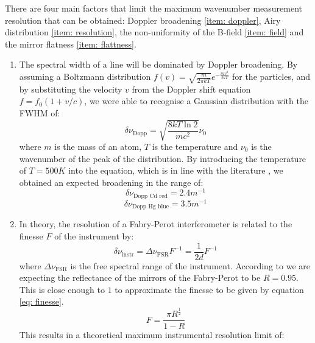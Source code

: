 \documentclass[11pt]{article}
\begin{document}
There are four main factors that limit the maximum wavenumber measurement resolution that can be obtained: Doppler broadening \ref{item: doppler}, Airy distribution \ref{item: resolution}, the non-uniformity of the B-field \ref{item: field} and the mirror flatness \ref{item: flattness}. 
\begin{enumerate}[label=(\alph*), ref=(\alph*)]
  \item \label{item: doppler} The spectral width of a line will be dominated by Doppler broadening. By assuming a Boltzmann distribution $f(v) = \sqrt{\frac{m}{2 \pi k T}} e^{-\frac{mv^2}{2kT}}$ for the particles, and by substituting the velocity $v$ from the Doppler shift equation $f = f_0 (1+v/c)$, we were able to recognise a Gaussian distribution with the FWHM of: 
  \begin{equation}
      \delta \nu_{\mathrm{Dopp}} = \sqrt{\frac{8 k T \ln{2}}{mc^2}} \nu_0
  \end{equation}
  where $m$ is the mass of an atom, $T$ is the temperature and $\nu_0$ is the wavenumber of the peak of the distribution. By introducing the temperature of $T = 500 \si{K}$ into the equation, which is in line with the literature \cite{doi:10.1098/rspa.1936.0108}, we obtained an expected broadening in the range of:
  \begin{equation}
      \delta \nu_{\text{Dopp Cd red}} = 2.4 \si{m^{-1}} \label{eq: nu doppler}
  \end{equation}
  \begin{equation}
      \delta \nu_{\text{Dopp Hg blue}} = 3.5 \si{m^{-1}}
  \end{equation}
  \item \label{item: resolution} In theory, the resolution of a Fabry-Perot interferometer is related to the finesse $F$ of the instrument by: 
  \begin{equation} \label{eq: instr resolution}
      \delta \nu_{\text{instr}} = \Delta \nu_{\text{FSR}} F^{-1} = \frac{1}{2d} F^{-1}
  \end{equation}
  where $\Delta \nu_{\text{FSR}}$ is the free spectral range of the instrument. According to \cite{FabryPerotEtalonGuide} we are expecting the reflectance of the mirrors of the Fabry-Perot to be $R = 0.95$. This is close enough to $1$ to approximate the finesse to be given by equation \eqref{eq: finesse}. 
  \begin{equation}
      F = \frac{\pi R^{\frac{1}{2}}}{1 - R} \label{eq: finesse}
  \end{equation}
  This results in a theoretical maximum instrumental resolution limit of: 

\end{enumerate}
\end{document}
